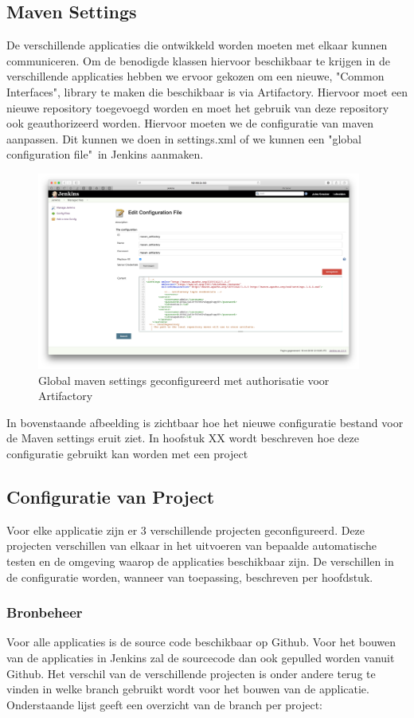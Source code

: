 \newpage
\subsection{Maven Settings}
De verschillende applicaties die ontwikkeld worden moeten met elkaar kunnen communiceren. Om de benodigde klassen hiervoor beschikbaar te krijgen in de verschillende applicaties hebben we ervoor gekozen om een nieuwe, "Common Interfaces", library te maken die beschikbaar is via Artifactory. 
Hiervoor moet een nieuwe repository toegevoegd worden en moet het gebruik van deze repository ook geauthorizeerd worden. Hiervoor moeten we de configuratie van maven aanpassen. Dit kunnen we doen in settings.xml of we kunnen een "global configuration file"\ in Jenkins aanmaken.

\begin{figure}[H]
	\centering
	\includegraphics[width=0.95\textwidth]{img/MavenSettings.png}
	\caption{Global maven settings geconfigureerd met authorisatie voor Artifactory}
	\label{fig:MavenSettings}
\end{figure}
In bovenstaande afbeelding is zichtbaar hoe het nieuwe configuratie bestand voor de Maven settings eruit ziet. In hoofstuk XX wordt beschreven hoe deze configuratie gebruikt kan worden met een project

\subsection{Configuratie van Project}
Voor elke applicatie zijn er 3 verschillende projecten geconfigureerd. Deze projecten verschillen van elkaar in het uitvoeren van bepaalde automatische testen en de omgeving waarop de applicaties beschikbaar zijn. De verschillen in de configuratie worden, wanneer van toepassing, beschreven per hoofdstuk.
\newpage
\subsubsection{Bronbeheer}
Voor alle applicaties is de source code beschikbaar op Github. Voor het bouwen van de applicaties in Jenkins zal de sourcecode dan ook gepulled worden vanuit Github. Het verschil van de verschillende projecten is onder andere terug te vinden in welke branch gebruikt wordt voor het bouwen van de applicatie. Onderstaande lijst geeft een overzicht van de branch per project:

